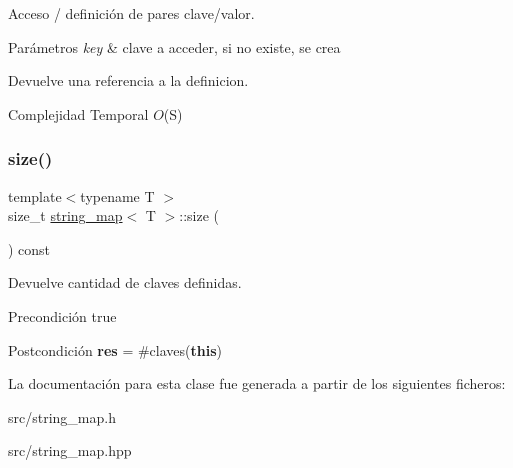 Acceso / definición de pares clave/valor. 


\begin{DoxyParams}{Parámetros}
{\em key} & clave a acceder, si no existe, se crea \\
\hline
\end{DoxyParams}
\begin{DoxyReturn}{Devuelve}
una referencia a la definicion.
\end{DoxyReturn}

\begin{DoxyDescription}
\item[Complejidad Temporal]$O$(S)
\end{DoxyDescription}\mbox{\label{classstring__map_a4fabf7143525fb9e00d7cf3279f6d854}} 
\subsubsection{\texorpdfstring{size()}{size()}}
{\footnotesize\ttfamily template$<$typename T $>$ \\
size\+\_\+t \mbox{\hyperlink{classstring__map}{string\+\_\+map}}$<$ T $>$\+::size (\begin{DoxyParamCaption}{ }\end{DoxyParamCaption}) const}



Devuelve cantidad de claves definidas. 

\begin{DoxyPrecond}{Precondición}
true 
\end{DoxyPrecond}
\begin{DoxyPostcond}{Postcondición}
{\bfseries res} = \#claves({\bfseries this}) 
\end{DoxyPostcond}


La documentación para esta clase fue generada a partir de los siguientes ficheros\+:\begin{DoxyCompactItemize}
\item 
src/string\+\_\+map.\+h\item 
src/string\+\_\+map.\+hpp\end{DoxyCompactItemize}
